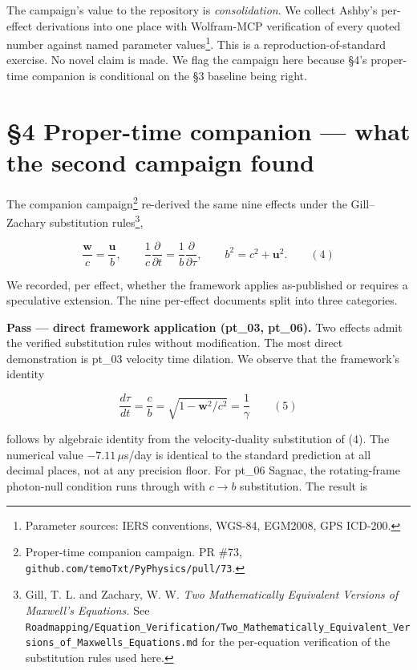 \documentclass[
  11pt,
]{article}
\begin{document}
The campaign's value to the repository is \emph{consolidation}. We
collect Ashby's per-effect derivations into one place with Wolfram-MCP
verification of every quoted number against named parameter
values\footnote{Parameter sources: IERS conventions, WGS-84, EGM2008,
  GPS ICD-200.}. This is a reproduction-of-standard exercise. No novel
claim is made. We flag the campaign here because §4's proper-time
companion is conditional on the §3 baseline being right.

\hypertarget{proper-time-companion-what-the-second-campaign-found}{%
\section{§4 Proper-time companion --- what the second campaign
found}\label{proper-time-companion-what-the-second-campaign-found}}

The companion campaign\footnote{Proper-time companion campaign. PR \#73,
  \texttt{github.com/temoTxt/PyPhysics/pull/73}.} re-derived the same
nine effects under the Gill--Zachary substitution rules\footnote{Gill,
  T. L. and Zachary, W. W. \emph{Two Mathematically Equivalent Versions
  of Maxwell's Equations.} See
  \texttt{Roadmapping/Equation\_Verification/Two\_Mathematically\_Equivalent\_Versions\_of\_Maxwells\_Equations.md}
  for the per-equation verification of the substitution rules used here.},

\[\frac{\mathbf{w}}{c} = \frac{\mathbf{u}}{b}, \qquad \frac{1}{c}\frac{\partial}{\partial t} = \frac{1}{b}\frac{\partial}{\partial \tau}, \qquad b^2 = c^2 + \mathbf{u}^2. \qquad (4)\]

We recorded, per effect, whether the framework applies as-published or
requires a speculative extension. The nine per-effect documents split
into three categories.

\textbf{Pass --- direct framework application (pt\_03, pt\_06).} Two
effects admit the verified substitution rules without modification. The
most direct demonstration is pt\_03 velocity time dilation. We observe
that the framework's identity

\[\frac{d\tau}{dt} = \frac{c}{b} = \sqrt{1 - \mathbf{w}^2/c^2} = \frac{1}{\gamma} \qquad (5)\]

follows by algebraic identity from the velocity-duality substitution of
(4). The numerical value \(-7.11\,\mu\)s/day is identical to the
standard prediction at all decimal places, not at any precision floor.
For pt\_06 Sagnac, the rotating-frame photon-null condition runs through
with \(c \to b\) substitution. The result is
\end{document}
